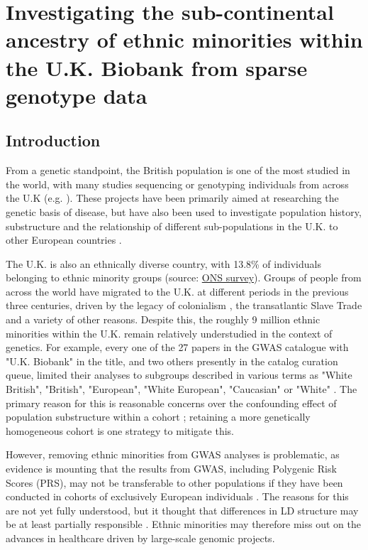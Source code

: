 \chapter{Investigating the sub-continental ancestry of ethnic minorities within the U.K. Biobank from sparse genotype data}
\label{chapterlabel3}

\section{Introduction}

From a genetic standpoint, the British population is one of the most studied in the world, with many studies sequencing or genotyping individuals from across the U.K (e.g. \cite{bycroft2018UK, Leslie2015, turnbull2018introducing, UK10k2015UK10k}). These projects have been primarily aimed at researching the genetic basis of disease, but have also been used to investigate population history, substructure  and the relationship of different sub-populations in the U.K. to other European countries \cite{Leslie2015, schiffels2016iron, liu2020human}.  

The U.K. is also an ethnically diverse country, with 13.8\% of individuals belonging to ethnic minority groups (source: \href{https://www.ons.gov.U.K./peoplepopulationandcommunity/populationandmigration/populationestimates/articles/researchreportonpopulationestimatesbyethnicgroupandreligion/2019-12-04}{ONS survey}). Groups of people from across the world have migrated to the U.K. at different periods in the previous three centuries, driven by the legacy of colonialism \cite{nasta2005voyaging}, the transatlantic Slave Trade and a variety of other reasons. Despite this, the roughly 9 million ethnic minorities within the U.K. remain relatively understudied in the context of genetics. For example, every one of the 27 papers in the GWAS catalogue with "U.K. Biobank" in the title, and two others presently in the catalog curation queue, limited their analyses to subgroups described in various terms as "White British", "British", "European", "White European", "Caucasian" or "White" \cite{manolio2019using}. The primary reason for this is reasonable concerns over the confounding effect of population substructure within a cohort \cite{hellwege2017population}; retaining a more genetically homogeneous cohort is one strategy to mitigate this. 

However, removing ethnic minorities from GWAS analyses is problematic, as evidence is mounting that the results from GWAS, including Polygenic Risk Scores (PRS), may not be transferable to other populations if they have been conducted in cohorts of exclusively European individuals \cite{kuchenbaecker2019transferability, martin2017human, bustamante2011genomics}. The reasons for this are not yet fully understood, but it thought that differences in LD structure may be at least partially responsible \cite{vilhjalmsson2015modeling}. Ethnic minorities may therefore miss out on the advances in healthcare driven by large-scale genomic projects. 

